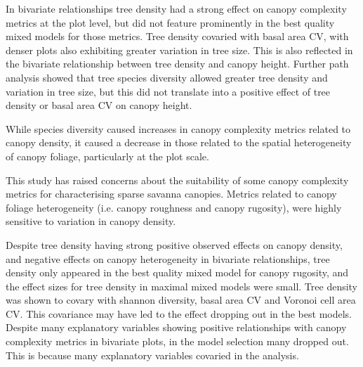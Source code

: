 \documentclass[11pt,a4paper]{article}
\begin{document}
In bivariate relationships tree density had a strong effect on canopy complexity metrics at the plot level, but did not feature prominently in the best quality mixed models for those metrics. Tree density covaried with basal area CV, with denser plots also exhibiting greater variation in tree size. This is also reflected in the bivariate relationship between tree density and canopy height. Further path analysis showed that tree species diversity allowed greater tree density and variation in tree size, but this did not translate into a positive effect of tree density or basal area CV on canopy height.

While species diversity caused increases in canopy complexity metrics related to canopy density, it caused a decrease in those related to the spatial heterogeneity of canopy foliage, particularly at the plot scale. 


This study has raised concerns about the suitability of some canopy complexity metrics for characterising sparse savanna canopies. Metrics related to canopy foliage heterogeneity (i.e. canopy roughness and canopy rugosity), were highly sensitive to variation in canopy density.

Despite tree density having strong positive observed effects on canopy density, and negative effects on canopy heterogeneity in bivariate relationships, tree density only appeared in the best quality mixed model for canopy rugosity, and the effect sizes for tree density in maximal mixed models were small. Tree density was shown to covary with shannon diversity, basal area CV and Voronoi cell area CV. This covariance may have led to the effect dropping out in the best models. Despite many explanatory variables showing positive relationships with canopy complexity metrics in bivariate plots, in the model selection many dropped out. This is because many explanatory variables covaried in the analysis.
\end{document}
